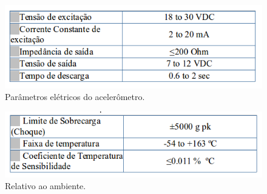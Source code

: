     \begin{figure}[!htbp]
	\centering
	\includegraphics[scale=0.5]{editaveis/figuras/param_eletrico_acelerometro}
	\caption[Parâmetros elétricos do acelerômetro]{Parâmetros elétricos do acelerômetro.}
	\label{param_eletrico_acelerometro}
      \end{figure}
   
    \begin{figure}[!htbp]
      \centering
      \includegraphics[scale=0.5]{editaveis/figuras/ambiente_acelerometro}
      \caption{Relativo ao ambiente.}
      \label{ambiente_acelerometro}
    \end{figure}
